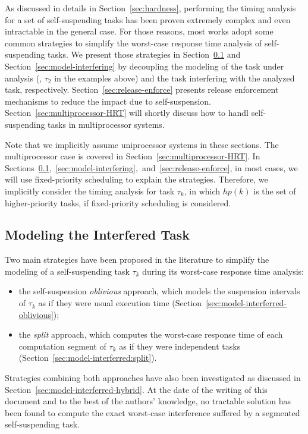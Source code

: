 As discussed in details in Section~\ref{sec:hardness}, performing the timing analysis for a set of self-suspending tasks has been proven extremely complex and even intractable in the general case. For those reasons, most works adopt some common strategies to simplify the worst-case response time analysis of self-suspending tasks. We present those strategies in Section~\ref{sec:model-interferred} and Section~\ref{sec:model-interfering} by decoupling the modeling of the task under analysis (\ie, $\tau_2$ in the examples above) and the task interfering with the analyzed task, respectively. Section~\ref{sec:release-enforce} presents  release enforcement mechanisms to reduce the impact due to self-suspension. Section~\ref{sec:multiprocessor-HRT} will shortly discuss how to handl self-suspending tasks in multiprocessor systems.


Note that we implicitly assume uniprocessor systems in these sections. The multiprocessor case is covered in Section~\ref{sec:multiprocessor-HRT}. In Sections~\ref{sec:model-interferred},~\ref{sec:model-interfering},~and~\ref{sec:release-enforce}, in most cases, we will use fixed-priority scheduling to explain the strategies. Therefore, we implicitly consider the timing analysis for task $\tau_k$, in which $hp(k)$ is the set of higher-priority tasks, if fixed-priority scheduling is considered.

\subsection{Modeling the Interfered Task}
\label{sec:model-interferred}

Two main strategies have been proposed in the literature to simplify the modeling of a self-suspending task $\tau_k$ during its worst-case response time analysis:
\begin{itemize}
\item the self-suspension \emph{oblivious} approach, which models the suspension intervals of $\tau_k$ as if they were usual execution time (Section~\ref{sec:model-interferred-oblivious});
\item the \emph{split} approach, which computes the worst-case response time of each computation segment of $\tau_k$ as if they were independent tasks (Section~\ref{sec:model-interferred:split}).
\end{itemize}
Strategies combining both approaches have also been investigated as discussed in Section~\ref{sec:model-interferred-hybrid}.
At the date of the writing of this document and to the best of the authors' knowledge, no tractable solution has been found to compute the exact worst-case interference suffered by a segmented self-suspending task. 




